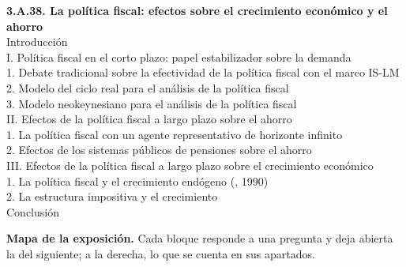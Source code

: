 \documentclass[11pt]{article}
\begin{document}
\begin{esquema}[unbreakable]
\textbf{3.A.38. La política fiscal: efectos sobre el crecimiento económico y el ahorro}\\[2pt]
Introducción\\
I. Política fiscal en el corto plazo: papel estabilizador sobre la demanda\\
\hspace*{1.5em}1. Debate tradicional sobre la efectividad de la política fiscal con el marco IS-LM\\
\hspace*{1.5em}2. Modelo del ciclo real para el análisis de la política fiscal\\
\hspace*{1.5em}3. Modelo neokeynesiano para el análisis de la política fiscal\\
II. Efectos de la política fiscal a largo plazo sobre el ahorro\\
\hspace*{1.5em}1. La política fiscal con un agente representativo de horizonte infinito\\
\hspace*{1.5em}2. Efectos de los sistemas públicos de pensiones sobre el ahorro\\
III. Efectos de la política fiscal a largo plazo sobre el crecimiento económico\\
\hspace*{1.5em}1. La política fiscal y el crecimiento endógeno (, 1990)\\
\hspace*{1.5em}2. La estructura impositiva y el crecimiento\\
Conclusión
\end{esquema}

\begin{anotaciones}
\textbf{Mapa de la exposición.} Cada bloque responde a una pregunta y deja abierta la del siguiente; a la derecha, lo que se cuenta en sus apartados.
\begin{infografiacaja}
\caption{Mapa de la exposición: la pregunta de cada bloque y el hilo que los une}\label{figu:mapa-tema}
\end{infografiacaja}
\end{anotaciones}
\end{document}
